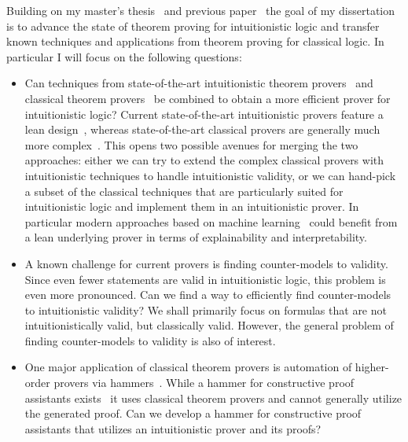 \documentclass{article}
\theoremstyle{definition}
\theoremstyle{definition}
\theoremstyle{definition}
\theoremstyle{definition}
\theoremstyle{definition}
\theoremstyle{definition}
\theoremstyle{definition}
\newcommand{\0}{\mathbf 0}
\newcommand{\1}{\mathbf 1}
\begin{document}
	Building on my master's thesis~\cite{thesis} and previous paper~\cite{pluska2023embedding} the goal of my dissertation is to advance the state of theorem proving for intuitionistic logic and transfer known techniques and applications from theorem proving for classical logic. In particular I will focus on the following questions:
	\begin{itemize}
		\item Can techniques from state-of-the-art intuitionistic theorem provers~\cite{otten2008leancop,otten2021nanocop} and classical theorem provers~\cite{kovacs2013first,schulz2002brainiac} be combined to obtain a more efficient prover for intuitionistic logic? Current state-of-the-art intuitionistic provers feature a lean design~\cite{otten2008leancop,otten2021nanocop}, whereas state-of-the-art classical provers are generally much more complex~\cite{kovacs2013first}. This opens two possible avenues for merging the two approaches: either we can try to extend the complex classical provers with intuitionistic techniques to handle intuitionistic validity, or we can hand-pick a subset of the classical techniques that are particularly suited for intuitionistic logic and implement them in an intuitionistic prover. In particular modern approaches based on machine learning~\cite{kaliszyk2018reinforcement,loos2017deep,rawson2019neurally} could benefit from a lean underlying prover in terms of explainability and interpretability.
		\item A known challenge for current provers is finding counter-models to validity. Since even fewer statements are valid in intuitionistic logic, this problem is even more pronounced. Can we find a way to efficiently find counter-models to intuitionistic validity? We shall primarily focus on formulas that are not intuitionistically valid, but classically valid. However, the general problem of finding counter-models to validity is also of interest.
		\item One major application of classical theorem provers is automation of higher-order provers via hammers~\cite{bohme2010sledgehammer}. While a hammer for constructive proof assistants exists~\cite{czajka2018hammer} it uses classical theorem provers and cannot generally utilize the generated proof. Can we develop a hammer for constructive proof assistants that utilizes an intuitionistic prover and its proofs?
	\end{itemize}
	


	
	
	
\end{document}
